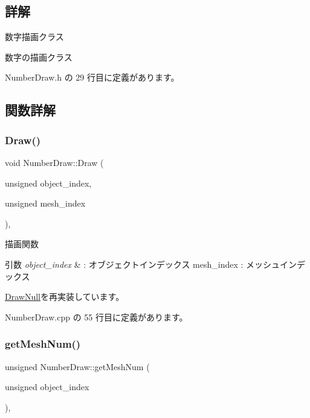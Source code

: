 \subsection{詳解}
数字描画クラス 

数字の描画クラス 

 Number\+Draw.\+h の 29 行目に定義があります。



\subsection{関数詳解}
\mbox{\label{class_number_draw_a15e4e602b3f9372349d0b6ff9e4fc423}} 
\subsubsection{\texorpdfstring{Draw()}{Draw()}}
{\footnotesize\ttfamily void Number\+Draw\+::\+Draw (\begin{DoxyParamCaption}\item[{unsigned}]{object\+\_\+index,  }\item[{unsigned}]{mesh\+\_\+index }\end{DoxyParamCaption})\hspace{0.3cm}{\ttfamily [override]}, {\ttfamily [virtual]}}



描画関数 


\begin{DoxyParams}{引数}
{\em object\+\_\+index} & \+: オブジェクトインデックス mesh\+\_\+index \+: メッシュインデックス \\
\hline
\end{DoxyParams}


\mbox{\hyperlink{class_draw_null_afe50f6fd820b18d673f70f048743f339}{Draw\+Null}}を再実装しています。



 Number\+Draw.\+cpp の 55 行目に定義があります。

\mbox{\label{class_number_draw_abcd88040b2b6d5dd7d21e8cfd50b1682}} 
\subsubsection{\texorpdfstring{get\+Mesh\+Num()}{getMeshNum()}}
{\footnotesize\ttfamily unsigned Number\+Draw\+::get\+Mesh\+Num (\begin{DoxyParamCaption}\item[{unsigned}]{object\+\_\+index }\end{DoxyParamCaption})\hspace{0.3cm}{\ttfamily [override]}, {\ttfamily [virtual]}}




